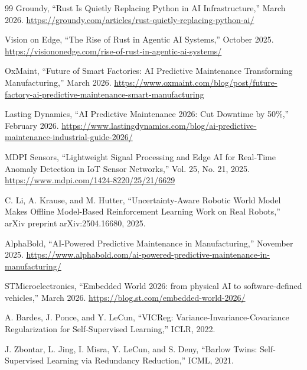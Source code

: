 \documentclass[11pt,a4paper]{ltjsarticle}
\begin{document}
\begin{thebibliography}{99}
Groundy,
``Rust Is Quietly Replacing Python in AI Infrastructure,''
March 2026.
\url{https://groundy.com/articles/rust-quietly-replacing-python-ai/}

Vision on Edge,
``The Rise of Rust in Agentic AI Systems,''
October 2025.
\url{https://visiononedge.com/rise-of-rust-in-agentic-ai-systems/}

OxMaint,
``Future of Smart Factories: AI Predictive Maintenance Transforming Manufacturing,''
March 2026.
\url{https://www.oxmaint.com/blog/post/future-factory-ai-predictive-maintenance-smart-manufacturing}

Lasting Dynamics,
``AI Predictive Maintenance 2026: Cut Downtime by 50\%,''
February 2026.
\url{https://www.lastingdynamics.com/blog/ai-predictive-maintenance-industrial-guide-2026/}

MDPI Sensors,
``Lightweight Signal Processing and Edge AI for Real-Time Anomaly Detection in IoT Sensor Networks,''
Vol. 25, No. 21, 2025.
\url{https://www.mdpi.com/1424-8220/25/21/6629}

C. Li, A. Krause, and M. Hutter,
``Uncertainty-Aware Robotic World Model Makes Offline Model-Based Reinforcement Learning Work on Real Robots,''
arXiv preprint arXiv:2504.16680, 2025.


AlphaBold,
``AI-Powered Predictive Maintenance in Manufacturing,''
November 2025.
\url{https://www.alphabold.com/ai-powered-predictive-maintenance-in-manufacturing/}

STMicroelectronics,
``Embedded World 2026: from physical AI to software-defined vehicles,''
March 2026.
\url{https://blog.st.com/embedded-world-2026/}

A. Bardes, J. Ponce, and Y. LeCun,
``VICReg: Variance-Invariance-Covariance Regularization for Self-Supervised Learning,''
ICLR, 2022.

J. Zbontar, L. Jing, I. Misra, Y. LeCun, and S. Deny,
``Barlow Twins: Self-Supervised Learning via Redundancy Reduction,''
ICML, 2021.


\end{thebibliography}
\end{document}
